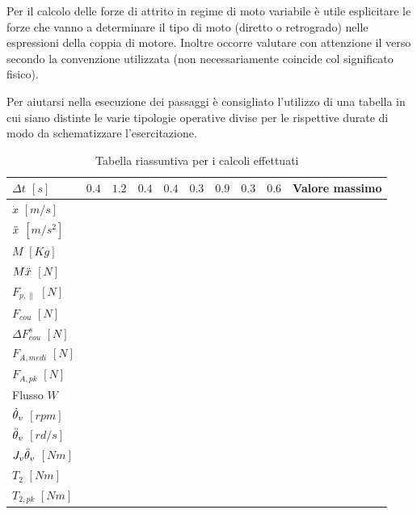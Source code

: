Per il calcolo delle forze di attrito in regime di moto variabile è utile esplicitare le forze che vanno a determinare il tipo di moto (diretto o retrogrado) nelle espressioni della coppia di motore.
Inoltre occorre valutare con attenzione il verso secondo la convenzione utilizzata (non necessariamente coincide col significato fisico).

Per aiutarsi nella esecuzione dei passaggi è consigliato l'utilizzo di una tabella in cui siano distinte le varie tipologie operative divise per le rispettive durate di modo da schematizzare l'esercitazione.

\begin{table}[h]
\centering
    \begin{tabular}{l|l|l|l|l|l|l|l|l|l}
    \hline
    $\Delta t$ $[s]$ & $0.4$ & $1.2$ & $0.4$ & $0.4$ & $0.3$ & $0.9$ & $0.3$ & $0.6$ & Valore massimo \\ \hline
    $\dot x$ $[m/s]$ & &  &  &  &  &  &  &  & \\ \cline{1-1}
    $\Ddot x$ $[m/s^2]$ &  &  &  &  &  &  &  &  &  \\ \cline{1-1}
    $M$ $[Kg]$ &  &  &  &  &  &  &  &  &  \\ \cline{1-1}
    \hline
    $M \Ddot x$ $[N]$ &  &  &  &  &  &  &  &  &  \\ \cline{1-1}
    $F_{p,\parallel}$ $[N]$ &  &  &  &  &  &  &  &  &  \\ \cline{1-1}
    $F_{cou}$ $[N]$ &  &  &  &  &  &  &  &  &  \\ \cline{1-1}
    $\Delta F_{cou}^s$ $[N]$ &  &  &  &  &  &  &  &  &  \\ \cline{1-1}
    \hline
    $F_{A,medi}$ $[N]$ &  &  &  &  &  &  &  &  &  \\ \cline{1-1}
    $F_{A,pk}$ $[N]$ &  &  &  &  &  &  &  &  &  \\ \cline{1-1}
    Flusso $W$ &  &  &  &  &  &  &  &  &  \\ \cline{1-1}
    \hline
    $\dot{\theta}_v$ $[rpm]$ &  &  &  &  &  &  &  &  &  \\ \cline{1-1}
    $\Ddot{\theta}_v$ $[rd/s]$ &  &  &  &  &  &  &  &  &  \\ \cline{1-1}
    \hline
    $J_v\Ddot{\theta}_v$ $[Nm]$  &  &  &  &  &  &  &  &  &  \\ \cline{1-1}
    $T_2$ $[Nm]$ &  &  &  &  &  &  &  &  &  \\ \cline{1-1}
    $T_{2,pk}$ $[Nm]$ &  &  &  &  &  &  &  &  &  \\ \cline{1-1}
    \end{tabular}
    \caption{Tabella riassuntiva per i calcoli effettuati}
\end{table}

